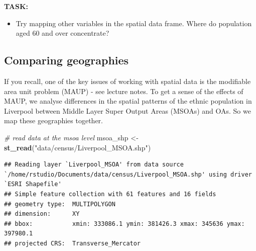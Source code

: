 \documentclass[
]{book}
\newenvironment{Shaded}{\begin{snugshade}}{\end{snugshade}}
\newcommand{\CommentTok}[1]{\textcolor[rgb]{0.56,0.35,0.01}{\textit{#1}}}
\newcommand{\KeywordTok}[1]{\textcolor[rgb]{0.13,0.29,0.53}{\textbf{#1}}}
\newcommand{\NormalTok}[1]{#1}
\newcommand{\StringTok}[1]{\textcolor[rgb]{0.31,0.60,0.02}{#1}}
\providecommand{\tightlist}{%
  \setlength{\itemsep}{0pt}\setlength{\parskip}{0pt}}
\begin{document}
\textbf{TASK:}

\begin{itemize}
\tightlist
\item
  Try mapping other variables in the spatial data frame. Where do population aged 60 and over concentrate?
\end{itemize}

\hypertarget{comparing-geographies}{%
\subsection{Comparing geographies}\label{comparing-geographies}}

If you recall, one of the key issues of working with spatial data is the modifiable area unit problem (MAUP) - see lecture notes. To get a sense of the effects of MAUP, we analyse differences in the spatial patterns of the ethnic population in Liverpool between Middle Layer Super Output Areas (MSOAs) and OAs. So we map these geographies together.

\begin{Shaded}
\begin{Highlighting}[]
\CommentTok{# read data at the msoa level}
\NormalTok{msoa_shp <-}\StringTok{ }\KeywordTok{st_read}\NormalTok{(}\StringTok{"data/census/Liverpool_MSOA.shp"}\NormalTok{)}
\end{Highlighting}
\end{Shaded}

\begin{verbatim}
## Reading layer `Liverpool_MSOA' from data source `/home/rstudio/Documents/data/census/Liverpool_MSOA.shp' using driver `ESRI Shapefile'
## Simple feature collection with 61 features and 16 fields
## geometry type:  MULTIPOLYGON
## dimension:      XY
## bbox:           xmin: 333086.1 ymin: 381426.3 xmax: 345636 ymax: 397980.1
## projected CRS:  Transverse_Mercator
\end{verbatim}
\end{document}
